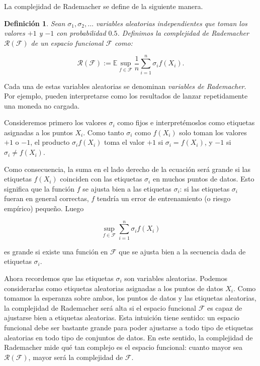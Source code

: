 \documentclass{report}
\newtheorem{dfn}{Definición}[section]
\begin{document}
La complejidad de Rademacher se define de la siguiente manera.\newline

\begin{dfn}
Sean \(\sigma_1, \sigma_2, \dots\) variables aleatorias independientes que toman los valores \(+1\) y \(-1\) 
con probabilidad \(0.5\). Definimos la complejidad de Rademacher \(\mathscr{R}(\mathcal{F})\) de un espacio funcional 
\(\mathcal{F}\) como:

\[
    \mathscr{R}(\mathcal{F}) := \mathbb{E} \sup_{f \in \mathcal{F}} \frac{1}{n} \sum_{i=1}^{n} \sigma_i f(X_i).
\]
\end{dfn}

Cada una de estas variables aleatorias se denominan \textit{variables de Rademacher}. 
Por ejemplo, pueden interpretarse como los resultados de lanzar repetidamente una moneda no cargada. 

Consideremos primero los valores \(\sigma_i\) como fijos e interpretémoslos como etiquetas asignadas a los puntos \(X_i\). Como tanto 
\(\sigma_i\) como \(f(X_i)\) solo toman los valores \(+1\) o \(-1\), el producto \(\sigma_i f(X_i)\) toma el 
valor \(+1\) si \(\sigma_i = f(X_i)\), y \(-1\) si \(\sigma_i \neq f(X_i)\). \newline

Como consecuencia, la suma en el lado derecho de la ecuación será grande si las etiquetas \(f(X_i)\) 
coinciden con las etiquetas \(\sigma_i\) en muchos puntos de datos. Esto significa que la función \(f\) 
se ajusta bien a las etiquetas \(\sigma_i\): si las etiquetas \(\sigma_i\) fueran en general correctas, 
\(f\) tendría un error de entrenamiento (o riesgo empírico) pequeño. Luego

\[
\sup_{f \in \mathcal{F}} \sum_{i=1}^{n} \sigma_i f(X_i)
\]

es grande si existe una función en \(\mathcal{F}\) que se ajusta bien a la secuencia dada de etiquetas \(\sigma_i\). \newline

Ahora recordemos que las etiquetas \(\sigma_i\) son variables aleatorias. Podemos considerarlas 
como etiquetas aleatorias asignadas a los puntos de datos \(X_i\). Como tomamos la esperanza sobre ambos, los 
puntos de datos y las etiquetas aleatorias, la complejidad de Rademacher será alta si el espacio funcional 
\(\mathcal{F}\) es capaz de ajustarse bien a etiquetas aleatorias. Esta intuición tiene sentido: un espacio 
funcional debe ser bastante grande para poder ajustarse a todo tipo de etiquetas aleatorias en todo tipo de 
conjuntos de datos. En este sentido, la complejidad de Rademacher mide qué tan complejo es el espacio 
funcional: cuanto mayor sea \(\mathscr{R}(\mathcal{F})\), mayor será la complejidad de \(\mathcal{F}\).\newline
\end{document}
